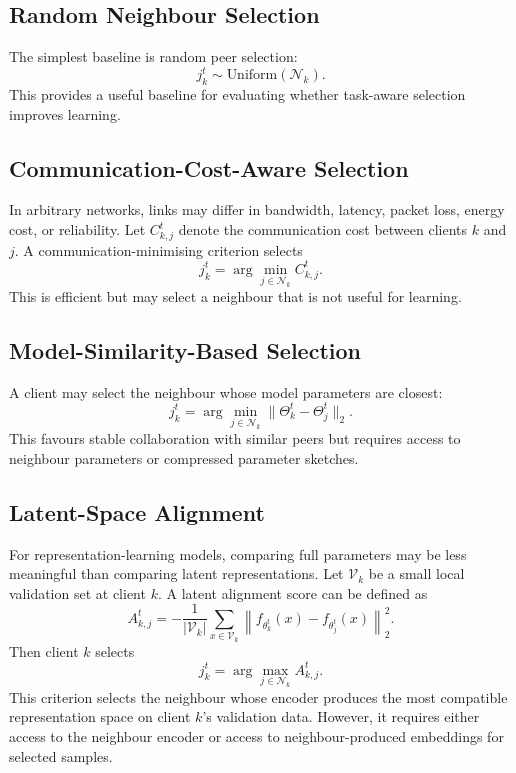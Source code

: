 \documentclass[conference]{IEEEtran}
\begin{document}
\subsection{Random Neighbour Selection}
\label{subsec:random-neighbour-selection}
The simplest baseline is random peer selection:
\begin{equation}
    j_k^t \sim \text{Uniform}(\mathcal{N}_k).
    \label{eq:auto-019}
\end{equation}
This provides a useful baseline for evaluating whether task-aware selection improves learning.

\subsection{Communication-Cost-Aware Selection}
\label{subsec:communication-cost-aware-selection}
In arbitrary networks, links may differ in bandwidth, latency, packet loss, energy cost, or reliability. Let \(C_{k,j}^t\) denote the communication cost between clients \(k\) and \(j\). A communication-minimising criterion selects
\begin{equation}
    j_k^t = \arg\min_{j\in\mathcal{N}_k} C_{k,j}^t.
    \label{eq:auto-020}
\end{equation}
This is efficient but may select a neighbour that is not useful for learning.

\subsection{Model-Similarity-Based Selection}
\label{subsec:model-similarity-based-selection}
A client may select the neighbour whose model parameters are closest:
\begin{equation}
    j_k^t
    =
    \arg\min_{j\in\mathcal{N}_k}
    \|\Theta_k^t-\Theta_j^t\|_2.
    \label{eq:auto-021}
\end{equation}
This favours stable collaboration with similar peers but requires access to neighbour parameters or compressed parameter sketches.

\subsection{Latent-Space Alignment}
\label{subsec:latent-space-alignment}
For representation-learning models, comparing full parameters may be less meaningful than comparing latent representations. Let \(\mathcal{V}_k\) be a small local validation set at client \(k\). A latent alignment score can be defined as
\begin{equation}
    A_{k,j}^{t}
    =
    -\frac{1}{|\mathcal{V}_k|}
    \sum_{x\in\mathcal{V}_k}
    \left\|
    f_{\theta_k^t}(x)-f_{\theta_j^t}(x)
    \right\|_2^2.
    \label{eq:auto-022}
\end{equation}
Then client \(k\) selects
\begin{equation}
    j_k^t = \arg\max_{j\in\mathcal{N}_k} A_{k,j}^{t}.
    \label{eq:auto-023}
\end{equation}
This criterion selects the neighbour whose encoder produces the most compatible representation space on client \(k\)'s validation data. However, it requires either access to the neighbour encoder or access to neighbour-produced embeddings for selected samples.
\end{document}

